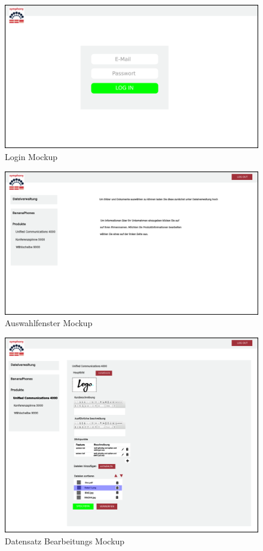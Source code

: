 \documentclass[a4paper,12pt]{article}
\begin{document}
\begin{figure}[!htb]
  \centering
     \includegraphics[width=1.0\textwidth]{projmicro_login.png}
  \caption{Login Mockup}
  \label{fig:login}
\end{figure}

\begin{figure}[!htb]
  \centering
     \includegraphics[width=1.0\textwidth]{projmicro_auswahl.png}
  \caption{Auswahlfenster Mockup}
  \label{fig:selection}
\end{figure}

\begin{figure}[!htb]
  \centering
     \includegraphics[width=1.0\textwidth]{projmicro_edit.png}
  \caption{Datensatz Bearbeitungs Mockup}
  \label{fig:edit}
\end{figure}
\end{document}
